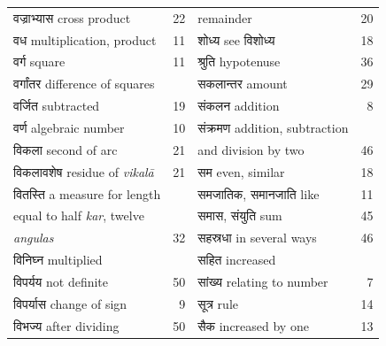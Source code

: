 \documentclass[]{article}
\begin{document}
{{\begin{tabular}{lr|lr}
वज्राभ्यास cross product &22&\quad remainder &20\\

वध multiplication, product& 11&शोध्य see विशोध्य &18\\

वर्ग square &11&श्रुति hypotenuse &36\\

वर्गांतर difference of squares&&सकलान्तर amount &29\\

वर्जित subtracted &19&संकलन addition &8\\

वर्ण algebraic number &10&संक्रमण addition, subtraction&\\

विकला second of arc &21&\quad and division by two &46\\

विकलावशेष residue of \textit{vikalā} &21&सम even, similar &18\\

वितस्ति a measure for length &&समजातिक, समानजाति like &11\\
\quad equal to half \textit{kar}, twelve &&समास, संयुति sum &45\\
\quad \textit{angulas} &32&सहस्रधा in several ways &46\\

विनिघ्न multiplied &&सहित increased&\\ 

विपर्यय not definite &50&सांख्य relating to number &7\\

विपर्यास change of sign& 9&सूत्र rule &14\\

विभज्य after dividing &50&सैक increased by one &13\\

\end{tabular}
}}
\newpage
\normalsize

{}
\end{document}
